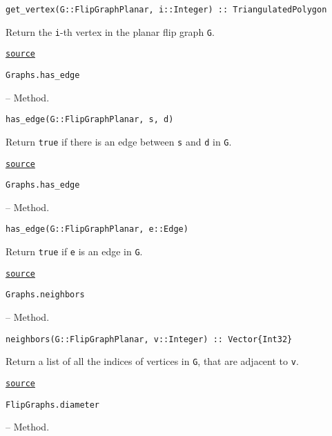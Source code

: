 \begin{adjustwidth}{2em}{0pt}


\begin{verbatim}
get_vertex(G::FlipGraphPlanar, i::Integer) :: TriangulatedPolygon
\end{verbatim}

Return the \texttt{i}-th vertex in the planar flip graph \texttt{G}.



\href{https://github.com/schto223/FlipGraphs.jl/blob/e35d43698a06b86273148826b79d585ba04fcd26/src/flipGraphPlanar.jl#L97-L101}{\texttt{source}}


\end{adjustwidth}
\hypertarget{13899120146903475816}{\texttt{Graphs.has\_edge}}  -- {Method.}

\begin{adjustwidth}{2em}{0pt}


\begin{verbatim}
has_edge(G::FlipGraphPlanar, s, d)
\end{verbatim}

Return \texttt{true} if there is an edge between \texttt{s} and \texttt{d} in \texttt{G}.



\href{https://github.com/schto223/FlipGraphs.jl/blob/e35d43698a06b86273148826b79d585ba04fcd26/src/flipGraphPlanar.jl#L43-L47}{\texttt{source}}


\end{adjustwidth}
\hypertarget{5416200093936098716}{\texttt{Graphs.has\_edge}}  -- {Method.}

\begin{adjustwidth}{2em}{0pt}


\begin{verbatim}
has_edge(G::FlipGraphPlanar, e::Edge)
\end{verbatim}

Return \texttt{true} if \texttt{e} is an edge in \texttt{G}.



\href{https://github.com/schto223/FlipGraphs.jl/blob/e35d43698a06b86273148826b79d585ba04fcd26/src/flipGraphPlanar.jl#L36-L40}{\texttt{source}}


\end{adjustwidth}
\hypertarget{4523162264564818691}{\texttt{Graphs.neighbors}}  -- {Method.}

\begin{adjustwidth}{2em}{0pt}


\begin{verbatim}
neighbors(G::FlipGraphPlanar, v::Integer) :: Vector{Int32}
\end{verbatim}

Return a list of all the indices of vertices in \texttt{G}, that are adjacent to \texttt{v}.



\href{https://github.com/schto223/FlipGraphs.jl/blob/e35d43698a06b86273148826b79d585ba04fcd26/src/flipGraphPlanar.jl#L67-L71}{\texttt{source}}


\end{adjustwidth}
\hypertarget{14666488080537054881}{\texttt{FlipGraphs.diameter}}  -- {Method.}

